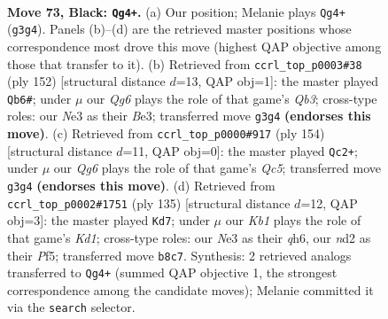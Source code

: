 \documentclass[11pt]{article}
\begin{document}
\clearpage

\begin{figure}[p]\centering
\begin{subfigure}{0.46\textwidth}\centering
\resizebox{\linewidth}{!}{%
\newchessgame
\chessboard[
  setfen={1k6/8/8/7K/8/4n1q1/3N4/8 b - - 1 73},
  showmover=false,
  pgfstyle=straightmove, color=movearrow, markmove={g3-g4}
]}
\caption{}
\end{subfigure}\hfill
\begin{subfigure}{0.46\textwidth}\centering
\resizebox{\linewidth}{!}{%
\newchessgame
\chessboard[
  setfen={8/6K1/k7/8/8/1Q2B3/8/8 w - - 3 77},
  showmover=false,
  pgfstyle=straightmove, color=movearrow, markmove={b3-b6}
]}
\caption{}
\end{subfigure}
\\[4pt]
\begin{subfigure}{0.46\textwidth}\centering
\resizebox{\linewidth}{!}{%
\newchessgame
\chessboard[
  setfen={8/8/8/2Q5/3N4/4K3/1k6/8 w - - 9 78},
  showmover=false,
  pgfstyle=straightmove, color=movearrow, markmove={c5-c2}
]}
\caption{}
\end{subfigure}\hfill
\begin{subfigure}{0.46\textwidth}\centering
\resizebox{\linewidth}{!}{%
\newchessgame
\chessboard[
  setfen={3k4/8/7Q/5p2/1P6/3q4/1K6/8 b - - 7 68},
  showmover=false,
  pgfstyle=straightmove, color=movearrow, markmove={d8-d7}
]}
\caption{}
\end{subfigure}
\caption{\textbf{Move 73, Black: \texttt{Qg4+}.} (a) Our position; Melanie plays \texttt{Qg4+} (\texttt{g3g4}). Panels (b)--(d) are the retrieved master positions whose correspondence most drove this move (highest QAP objective among those that transfer to it). (b) Retrieved from \texttt{ccrl\_top\_p0003\#38} (ply 152) [structural distance $d$=13, QAP obj=1]: the master played \texttt{Qb6\#}; under $\mu$ our \emph{Qg6} plays the role of that game's \emph{Qb3}; cross-type roles: our \emph{N}e3 as their \emph{B}e3; transferred move \texttt{g3g4} \textbf{(endorses this move)}. (c) Retrieved from \texttt{ccrl\_top\_p0000\#917} (ply 154) [structural distance $d$=11, QAP obj=0]: the master played \texttt{Qc2+}; under $\mu$ our \emph{Qg6} plays the role of that game's \emph{Qc5}; transferred move \texttt{g3g4} \textbf{(endorses this move)}. (d) Retrieved from \texttt{ccrl\_top\_p0002\#1751} (ply 135) [structural distance $d$=12, QAP obj=3]: the master played \texttt{Kd7}; under $\mu$ our \emph{Kb1} plays the role of that game's \emph{Kd1}; cross-type roles: our \emph{N}e3 as their \emph{q}h6, our \emph{n}d2 as their \emph{P}f5; transferred move \texttt{b8c7}. Synthesis: 2 retrieved analogs transferred to \texttt{Qg4+} (summed QAP objective 1, the strongest correspondence among the candidate moves); Melanie committed it via the \texttt{search} selector.}
\label{fig:thought-m145}
\end{figure}
\end{document}
